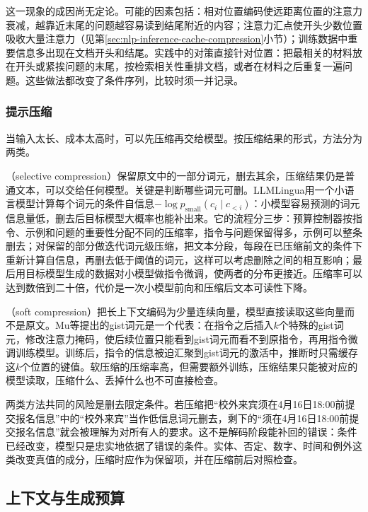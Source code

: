 这一现象的成因尚无定论。可能的因素包括：相对位置编码使远距离位置的注意力衰减，越靠近末尾的问题越容易读到结尾附近的内容；注意力汇点使开头少数位置吸收大量注意力（见第\ref{sec:nlp-inference-cache-compression}小节）；训练数据中重要信息多出现在文档开头和结尾。实践中的对策直接针对位置：把最相关的材料放在开头或紧挨问题的末尾，按检索相关性重排文档，或者在材料之后重复一遍问题。这些做法都改变了条件序列，比较时须一并记录。

\subsubsection{提示压缩}
\label{sec:nlp-inference-prompt-compression}

当输入太长、成本太高时，可以先压缩再交给模型。按压缩结果的形式，方法分为两类。

（selective compression）保留原文中的一部分词元，删去其余，压缩结果仍是普通文本，可以交给任何模型。关键是判断哪些词元可删。LLMLingua用一个小语言模型计算每个词元的条件自信息$-\log p_{\mathrm{small}}(c_i\mid c_{<i})$：小模型容易预测的词元信息量低，删去后目标模型大概率也能补出来。它的流程分三步：预算控制器按指令、示例和问题的重要性分配不同的压缩率，指令与问题保留得多，示例可以整条删去；对保留的部分做迭代词元级压缩，把文本分段，每段在已压缩前文的条件下重新计算自信息，再删去低于阈值的词元，这样可以考虑删除之间的相互影响；最后用目标模型生成的数据对小模型做指令微调，使两者的分布更接近。压缩率可以达到数倍到二十倍，代价是一次小模型前向和压缩后文本可读性下降。

（soft compression）把长上下文编码为少量连续向量，模型直接读取这些向量而不是原文。Mu等提出的gist词元是一个代表\cite{nlp-inference-mu2023gist}：在指令之后插入$k$个特殊的gist词元，修改注意力掩码，使后续位置只能看到gist词元而看不到原指令，再用指令微调训练模型。训练后，指令的信息被迫汇聚到gist词元的激活中，推断时只需缓存这$k$个位置的键值。软压缩的压缩率高，但需要额外训练，压缩结果只能被对应的模型读取，压缩什么、丢掉什么也不可直接检查。

两类方法共同的风险是删去限定条件。若压缩把“校外来宾须在4月16日18:00前提交报名信息”中的“校外来宾”当作低信息词元删去，剩下的“须在4月16日18:00前提交报名信息”就会被理解为对所有人的要求。这不是解码阶段能补回的错误：条件已经改变，模型只是忠实地依据了错误的条件。实体、否定、数字、时间和例外这类改变真值的成分，压缩时应作为保留项，并在压缩前后对照检查。

\subsection{上下文与生成预算}
\label{sec:nlp-inference-budget}

